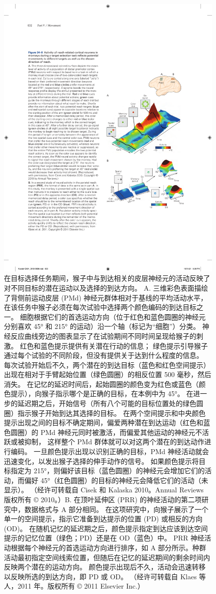 \begin{figure}[htbp]
	\centering
	\includegraphics[width=0.5\linewidth]{chap34/fig_34_8}
	\caption{在目标选择任务期间，猴子中与到达相关的皮层神经元的活动反映了对不同目标的潜在运动以及选择的到达方向。 A. 三维彩色表面描绘了背侧前运动皮层 (PMd) 神经元群体相对于基线的平均活动水平，在该任务中猴子必须在每次试验中选择两个颜色编码的到达目标之一。 细胞根据它们的首选运动方向（位于红色和蓝色圆圈的神经元分别喜欢 45° 和 215° 的运动）沿一个轴（标记为“细胞”）分类。 神经反应曲线旁边的图表显示了在试验期间不同时间呈现给猴子的刺激。 红色和蓝色提示提供有关潜在行动的信息； 绿色提示引导猴子通过每个试验的不同阶段，但没有提供关于达到什么程度的信息。 每次试验开始后不久，两个潜在的到达目标（蓝色和红色空间提示）出现在相对于手臂起始位置（绿色圆圈）的相反位置 500 毫秒，然后消失。 在记忆的延迟时间后，起始圆圈的颜色变为红色或蓝色（颜色提示），向猴子指示哪个是正确的目标，在本例中为 45°。 在进一步的延迟期之后，开始信号（所有八个可能的目标位置处的绿色圆圈）指示猴子开始到达其选择的目标。 在两个空间提示和中央颜色提示出现之间的目标不确定期间，偏爱两种潜在到达运动（红色和蓝色圆圈）的 PMd 神经元同时被激活，而偏爱其他运动的神经元不活跃或被抑制， 这样整个 PMd 群体就可以对这两个潜在的到达动作进行编码。 一旦颜色提示出现以识别正确的目标，PMd 神经活动就会迅速变化，以发出猴子选择的伸手动作的信号。 如果颜色提示将目标指定为 215°，则偏好该目标（蓝色圆圈）的神经元会增加它们的活动，而偏好 45°（红色圆圈）的目标的神经元会降低它们的活动（未显示）。 （经许可转载自 Cisek 和 Kalaska 2010。Annual Reviews 版权所有 © 2010。）B. 在顶叶延伸区 (PRR) 的神经活动的第二项研究中，数据格式与 A 部分相同。 在这项研究中，向猴子展示了一个单一的空间提示，指示它准备到达提示的位置 (PD) 或相反的方向 (OD)。 在随机记忆的延迟期之后，颜色提示指定到达应该到达空间提示的记忆位置（绿色；PD）还是在 OD（蓝色）中。 PRR 神经活动根据每个神经元的首选运动方向进行排序，如 A 部分所示。种群活动最初指定空间线索位置，但随后在记忆的延迟期间的剩余时间内反映两个潜在的运动方向。 颜色提示出现后不久，活动会迅速转移以反映所选的到达方向，即 PD 或 OD。 （经许可转载自 Klaes 等人，2011 年。版权所有 © 2011 Elsevier Inc.）}
	\label{fig:34_8}
\end{figure}

